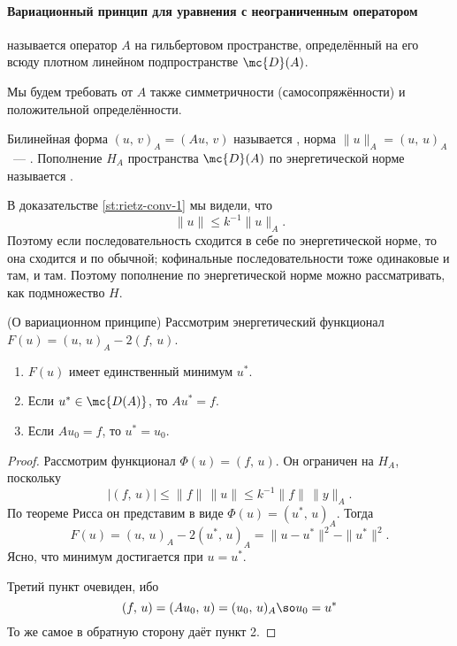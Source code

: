 \documentclass{trlnotes}
\begin{document}
    \paragraph{Вариационный принцип для уравнения с неограниченным оператором}

    \begin{de}
         называется оператор $A$ на гильбертовом пространстве, определённый на его всюду плотном линейном подпространстве $\mc{D}(A)$.
    \end{de}

    Мы будем требовать от $A$ также симметричности (самосопряжённости) и положительной определённости.

    \begin{de}
        Билинейная форма $(u, \, v)_A = (Au, \, v)$ называется , норма $\|u\|_A = (u, \, u)_A$~--- . Пополнение $H_A$ пространства $\mc{D}(A)$ по энергетической норме называется . 
    \end{de}

    \begin{rem}
        В доказательстве \ref{st:rietz-conv-1} мы видели, что
        \[
            \|u\| \leqslant k^{-1} \|u\|_A.
        \]
        Поэтому если последовательность сходится в себе по энергетической норме, то она сходится и по обычной; кофинальные последовательности тоже одинаковые и там, и там. Поэтому пополнение по энергетической норме можно рассматривать, как подмножество $H$.
    \end{rem}

    \begin{thm}(О вариационном принципе)
        Рассмотрим энергетический функционал $F(u) = (u, \, u)_A - 2(f, \, u)$.
        \begin{enumerate}
            \item $F(u)$ имеет единственный минимум $u^*$.
            \item Если $u^* \in \mc{D(A)}$, то $Au^* = f$.
            \item Если $Au_0 = f$, то $u^* = u_0$.
        \end{enumerate}
        \begin{proof}
            Рассмотрим функционал $\Phi(u) = (f, \, u)$. Он ограничен на $H_A$, поскольку
            \[
                \big|(f, \, u)\big| \leqslant \|f\| \, \|u\| \leqslant k^{-1} \|f\| \, \|y\|_A.
            \]
            По теореме Рисса он представим в виде $\Phi(u) = (u^*, \, u)_A$.
            Тогда
            \[
                F(u) = (u, \, u)_A - 2(u^*, \, u)_A = \|u - u^*\|^2 - \|u^*\|^2.
            \]
            Ясно, что минимум достигается при $u = u^*$.

            Третий пункт очевиден, ибо
            \[
                (f, \, u) = (Au_0, \, u) = (u_0, \, u)_A \so u_0 = u^*
            \]
            То же самое в обратную сторону даёт пункт 2.
        \end{proof}
    \end{thm}
\end{document}
